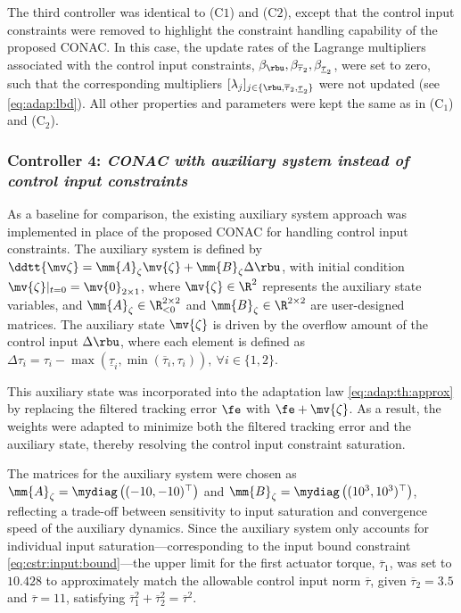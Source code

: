 \documentclass[journal]{IEEEtran}
\begin{document}
The third controller was identical to (C$1$) and (C$2$), except that the control input constraints were removed to highlight the constraint handling capability of the proposed CONAC.
In this case, the update rates of the Lagrange multipliers associated with the control input constraints, \ie $\beta_{\rbu},\beta_{\overline{\tau}_2},\beta_{\underline{\tau}_2}$, were set to zero, such that the corresponding multipliers $[\lambda_j]_{j\in\{\rbu,\overline{\tau}_2,\underline{\tau}_2\}}$ were not updated (see \eqref{eq:adap:lbd}).
All other properties and parameters were kept the same as in (C$_1$) and (C$_2$).

\subsubsection*{Controller 4:  \textit{CONAC with auxiliary system instead of control input constraints}}

As a baseline for comparison, the existing auxiliary system approach \cite{Esfandiari:2014aa, Karason:1994aa, Esfandiari:2015aa} was implemented in place of the proposed CONAC for handling control input constraints.
The auxiliary system is defined by $\ddtt{\mv\zeta} = \mm{A}_\zeta \mv{\zeta} + \mm{B}_\zeta \Delta\rbu$, with initial condition $\mv{\zeta}\vert_{t=0} = \mv{0}_{2\times1}$, where $\mv{\zeta}\in\R^2$ represents the auxiliary state variables, and $\mm{A}_\zeta\in\R_{<0}^{2\times 2}$ and $\mm{B}_\zeta\in\R^{2\times 2}$ are user-designed matrices.
The auxiliary state $\mv{\zeta}$ is driven by the overflow amount of the control input $\Delta\rbu$, where each element is defined as $\Delta\tau_{i} = \tau_{i}-\max(\underline\tau_i,\min(\overline\tau_i,\tau_i)),\ \forall i\in\{1,2\}$.

This auxiliary state was incorporated into the adaptation law \eqref{eq:adap:th:approx} by replacing the filtered tracking error $\fe$ with $\fe+\mv{\zeta}$.
As a result, the weights were adapted to minimize both the filtered tracking error and the auxiliary state, thereby resolving the control input constraint saturation.

The matrices for the auxiliary system were chosen as $\mm{A}_\zeta=\mydiag\left((-10,-10)^\top\right)$ and $\mm{B}_\zeta=\mydiag\left((10^3,10^3)^\top\right)$, reflecting a trade-off between sensitivity to input saturation and convergence speed of the auxiliary dynamics.
Since the auxiliary system only accounts for individual input saturation—corresponding to the input bound constraint \eqref{eq:cstr:input:bound}—the upper limit for the first actuator torque, $\overline{\tau}_1$, was set to $10.428$ to approximately match the allowable control input norm $\overline{\tau}$, given $\overline{\tau}_2 = 3.5$ and $\overline{\tau} = 11$, satisfying $\overline{\tau}_1^2 + \overline{\tau}_2^2 = \overline{\tau}^2$.
\end{document}
